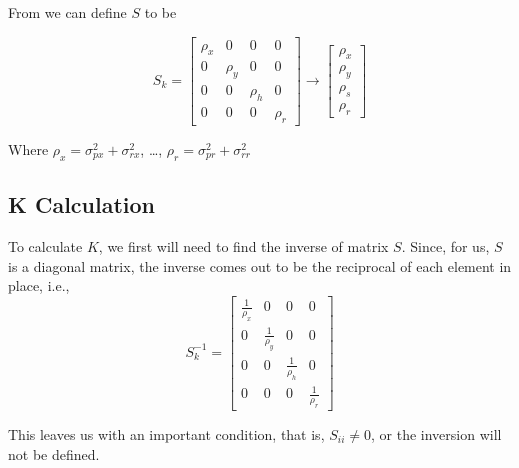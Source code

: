 \documentclass[10pt]{article}
\begin{document}
    \noindent From  we can define \(S\) to be 

    \begin{equation}
        S_k = \begin{bmatrix}
            \rho_x & 0 & 0 & 0 \\
            0 & \rho_y & 0 & 0 \\
            0 & 0 & \rho_h & 0 \\
            0 & 0 & 0 & \rho_r
        \end{bmatrix}
        \rightarrow
        \begin{bmatrix}
            \rho_x \\
            \rho_y \\
            \rho_s \\
            \rho_r
        \end{bmatrix}
    \end{equation}

    \noindent Where \(\rho_x = \sigma^2_{px} + \sigma^2_{rx}\), \dots, \(\rho_r = \sigma^2_{pr} + \sigma^2_{rr}\)

    \subsection{K Calculation}

    To calculate \(K\), we first will need to find the inverse of matrix \(S\). Since, for us, \(S\) is a diagonal matrix, the inverse comes out to be the reciprocal of each element in place, i.e.,
    \[
        S^{-1}_k = \begin{bmatrix}
            \frac{1}{\rho_x} & 0 & 0 & 0 \\
            0 & \frac{1}{\rho_y} & 0 & 0 \\
            0 & 0 & \frac{1}{\rho_h} & 0 \\
            0 & 0 & 0 & \frac{1}{\rho_r}
        \end{bmatrix}
    \]

    \noindent This leaves us with an important condition, that is, \(S_{ii} \not= 0\), or the inversion will not be defined.
\end{document}
